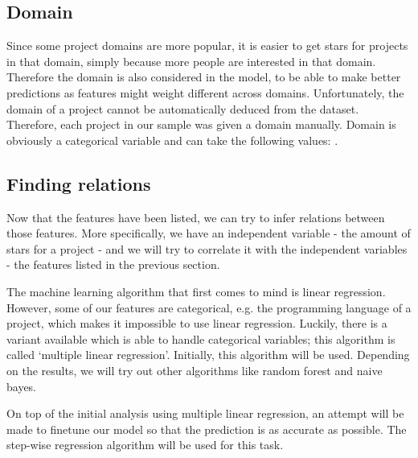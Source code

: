  
    \subsection{Domain}
        Since some project domains are more popular, it is easier to get stars for projects in that domain, simply because more people are interested in that domain.
        Therefore the domain is also considered in the model, to be able to make better predictions as features might weight different across domains.
        Unfortunately, the domain of a project cannot be automatically deduced from the dataset. 
        Therefore, each project in our sample was given a domain manually. Domain is obviously a categorical variable and can take the following values: .

    
    
    \subsection{Finding relations}
        Now that the features have been listed, we can try to infer relations between those features. More specifically, we have an independent variable - the amount of stars for a project - and we will try to correlate it with the independent variables - the features listed in the previous section.
        
        The machine learning algorithm that first comes to mind is linear regression. However, some of our features are categorical, e.g. the programming language of a project, which makes it impossible to use linear regression.
        Luckily, there is a variant available which is able to handle categorical variables; this algorithm is called `multiple linear regression'. 
        Initially, this algorithm will be used. Depending on the results, we will try out other algorithms like random forest and naive bayes.
        
        On top of the initial analysis using multiple linear regression, an attempt will be made to finetune our model so that the prediction is as accurate as possible. The step-wise regression algorithm will be used for this task.
    
